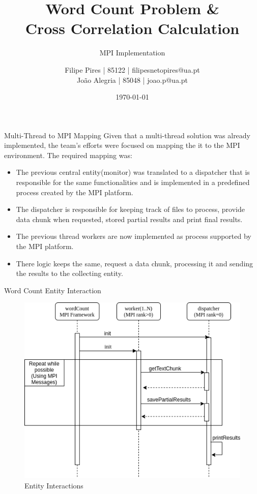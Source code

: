 \documentclass{beamer}
\title{Word Count Problem \& \\Cross Correlation Calculation}
\subtitle{MPI Implementation}
\author{Filipe Pires | 85122 | filipesnetopires@ua.pt \\ João Alegria | 85048 | joao.p@ua.pt}
\institute{University of Aveiro, DETI}
\date{\today}
\begin{document}

\begin{frame}
	\maketitle %
\end{frame}


\begin{frame}{Multi-Thread to MPI Mapping}
	Given that a multi-thread solution was already implemented, the team's efforts were focused on mapping the it to the MPI environment.
	The required mapping was:
	\begin{itemize}
		\item The previous central entity(monitor) was translated to a dispatcher that is responsible for the same functionalities and is implemented in a predefined process created by the MPI platform.
		\item The dispatcher is responsible for keeping track of files to process, provide data chunk when requested, stored partial results and print final results.
		\item The previous thread workers are now implemented as process supported by the MPI platform.
		\item There logic keeps the same, request a data chunk, processing it and sending the results to the collecting entity.
	\end{itemize}
\end{frame}


\begin{frame}{Word Count Entity Interaction}
	\begin{figure}
		\includegraphics[width=0.7\linewidth]{wordCountInteraction.png}
		\caption{Entity Interactions}
		\label{wordInteraction}
	\end{figure}
\end{frame}
\end{document}
